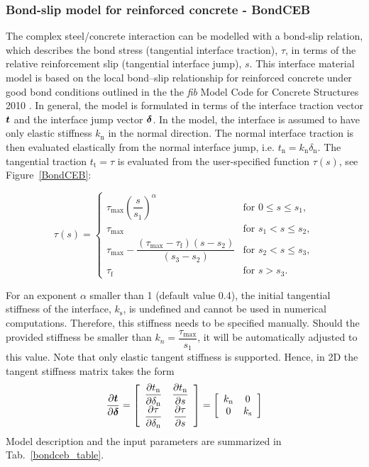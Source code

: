\documentclass[a4paper]{article}
\newcommand{\mbf}[1]{\mbox{\boldmath$#1$}}
\begin{document}
\subsubsection{Bond-slip model for reinforced concrete - BondCEB}
The complex steel/concrete interaction can be modelled with a bond-slip relation, which describes the bond stress (tangential interface traction), $\tau$, in terms of the relative reinforcement slip (tangential interface jump), $s$. This interface material model is based on the local bond--slip relationship for reinforced concrete under good bond conditions outlined in the the \textit{fib} Model Code for Concrete Structures 2010 \cite{fib:2010}.
In general, the model is formulated in terms of the interface traction vector $\mbf{t}$ and the interface jump vector $\mbf{\delta}$. 
In the model, the interface is assumed to have only elastic stiffness $k_{\text{n}}$ in the normal direction. The normal interface traction is then evaluated elastically from the normal interface jump, i.e. $t_{\text{n}} =  k_{\text{n}} \delta_{\text{n}}$. The tangential traction $t_{\text{t}} = \tau$ is evaluated from the user-specified function $\tau (s)$, see Figure~\ref{BondCEB}:

\begin{equation}
\tau (s) = \begin{cases}
	\tau_\text{max} \left( \dfrac{s}{s_1} \right) ^ \alpha & \text{for } 0 \leq s \leq s_1, \\
	\tau_\text{max} & \text{for } s_1 < s \leq s_2, \\
	\tau_\text{max} - \dfrac{\left( \tau_\text{max} - \tau_\text{f} \right) \left(s-s_2 \right)}{\left( s_3 - s_2 \right)} & \text{for } s_2 < s \leq s_3, \\
	\tau_\text{f} & \text{for } s > s_3.
	\end{cases}
\end{equation}

\noindent For an exponent $\alpha$ smaller than 1 (default value 0.4), the initial tangential stiffness of the interface, $k_{\text{s}}$, is undefined and cannot be used in numerical computations. Therefore, this stiffness needs to be specified manually. Should the provided stiffness be smaller than $k_n = \dfrac{\tau_\text{max}}{s_1}$, it will be automatically adjusted to this value. Note that only elastic tangent stiffness is supported. Hence, in 2D the tangent stiffness matrix takes the form
\begin{equation}
\dfrac{\partial \mbf{t}}{\partial \mbf{\delta}}= \left[ \begin{array}{cc}
\dfrac{\partial t_\text{n}}{\partial \delta_\text{n}} &
\dfrac{\partial t_\text{n}}{\partial s} \\
\dfrac{\partial \tau}{\partial \delta_\text{n}} & \dfrac{\partial \tau}{\partial s}
\end{array} \right] =
\left[ \begin{array}{cc}
k_\text{n} & 0 \\ 0 & k_\text{s}
\end{array} \right]
\end{equation}
Model description and the input parameters are summarized in Tab.~\ref{bondceb_table}.
\end{document}
